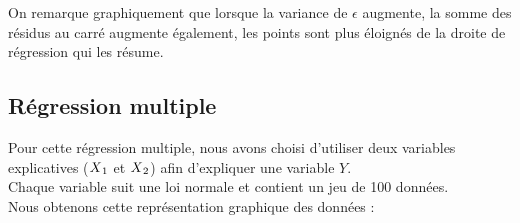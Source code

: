 \documentclass[paper=a4, fontsize=11pt]{scrartcl} %
\numberwithin{equation}{section} %
\numberwithin{figure}{section} %
\numberwithin{table}{section} %
\begin{document}
\iffalse 
\begin{figure}[!htb]
\minipage{0.5\textwidth}
  \texttt{[image: Question\_III-2\_avec\_variance\_de\_e=0.png]}
  \caption{Var($\epsilon$)$=0$}\label{fig:3-2_var_e_0}
\endminipage
\minipage{0.5\textwidth}
  \texttt{[image: Question\_III-2\_avec\_variance\_de\_e=10.png]}
  \caption{Var($\epsilon$)$=10$}\label{fig:3-2_var_e_10}
\endminipage
\end{figure}
\begin{figure}[!htb]
\minipage{0.5\textwidth}
  \texttt{[image: Question\_III-2\_avec\_variance\_de\_e=20.png]}
  \caption{Var($\epsilon$)$=20$}\label{fig:3-2_var_e_20}
\endminipage\hfill
\minipage{0.5\textwidth}
  \texttt{[image: Question\_III-2\_avec\_variance\_de\_e=30.png]}
  \caption{Var($\epsilon$)$=30$}\label{fig:3-2_var_e_30}
\endminipage
\end{figure}
\begin{figure}[!htb]
\minipage{0.5\textwidth}
  \texttt{[image: Question\_III-2\_avec\_variance\_de\_e=40.png]}
  \caption{Var($\epsilon$)$=40$}\label{fig:3-2_var_e_40}
\endminipage\hfill
\minipage{0.5\textwidth}
  \texttt{[image: Question\_III-2\_avec\_variance\_de\_e=50.png]}
  \caption{Var($\epsilon$)$=50$}\label{fig:3-2_var_e_50}
\endminipage
\end{figure}
\fi

On remarque graphiquement que lorsque la variance de $\epsilon$ augmente, la somme des résidus au carré augmente également, les points sont plus éloignés de la droite de régression qui les résume.

\newpage
\subsection{Régression multiple}
Pour cette régression multiple, nous avons choisi d'utiliser deux variables explicatives ($X\textsubscript{1}$ et $X\textsubscript{2}$) afin d'expliquer une variable $Y$.\\
Chaque variable suit une loi normale et contient un jeu de 100 données.\\
Nous obtenons cette représentation graphique des données :
\begin{center}
\end{center}
\begin{center}
\end{center}
\end{document}
